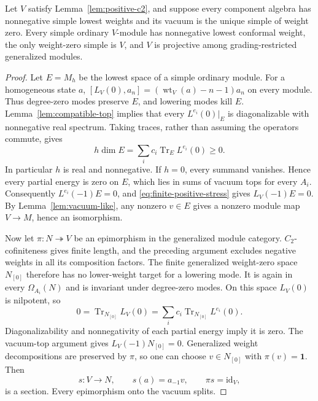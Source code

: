 \begin{lemma}
\label{lem:vacuum-projective}
Let $V$ satisfy Lemma~\ref{lem:positive-c2}, and suppose every component
algebra has nonnegative simple lowest weights and its vacuum is the
unique simple of weight zero. Every simple ordinary $V$-module has
nonnegative lowest conformal weight, the only weight-zero simple is
$V$, and $V$ is projective among grading-restricted generalized modules.
\end{lemma}
\begin{proof}
Let $E=M_h$ be the lowest space of a simple ordinary module.
For a homogeneous state $a$,
$[L_V(0),a_n]=(\operatorname{wt}_V(a)-n-1)a_n$ on every module.
Thus degree-zero modes preserve $E$, and lowering modes kill $E$.
Lemma~\ref{lem:compatible-top} implies that every
$L^{e_i}(0)|_E$ is diagonalizable with nonnegative real spectrum.
Taking traces, rather than assuming the operators commute, gives
\begin{equation}
 h\dim E=\sum_i c_i\operatorname{Tr}_E L^{e_i}(0)\ge0.
 \label{eq:top-trace}
\end{equation}
In particular $h$ is real and nonnegative. If $h=0$, every summand vanishes.
Hence every partial energy is zero
on $E$, which lies in sums of vacuum tops for every $A_i$. Consequently
$L^{e_i}(-1)E=0$, and \eqref{eq:finite-positive-stress} gives
$L_V(-1)E=0$. By Lemma~\ref{lem:vacuum-like}, any nonzero $v\in E$
gives a nonzero module map $V\to M$, hence an
isomorphism.

Now let $\pi:N\twoheadrightarrow V$ be an epimorphism in the generalized
module category. $C_2$-cofiniteness gives finite length, and the preceding
argument excludes negative weights in all its composition factors.
The finite generalized weight-zero space $N_{[0]}$ therefore has no
lower-weight target for a lowering mode. It is again in every
$\Omega_{A_i}(N)$ and is invariant under degree-zero modes. On this
space $L_V(0)$ is nilpotent, so
\[
 0=\operatorname{Tr}_{N_{[0]}}L_V(0)
  =\sum_i c_i\operatorname{Tr}_{N_{[0]}}L^{e_i}(0).
\]
Diagonalizability and nonnegativity of each partial energy imply it is
zero. The vacuum-top argument gives $L_V(-1)N_{[0]}=0$. Generalized
weight decompositions are preserved by $\pi$, so one can choose
$v\in N_{[0]}$ with $\pi(v)=\mathbf1$. Then
\[
 s:V\longrightarrow N,\qquad s(a)=a_{-1}v,
 \qquad \pi s=\mathrm{id}_V,
\]
is a section. Every epimorphism onto the vacuum splits.
\end{proof}

